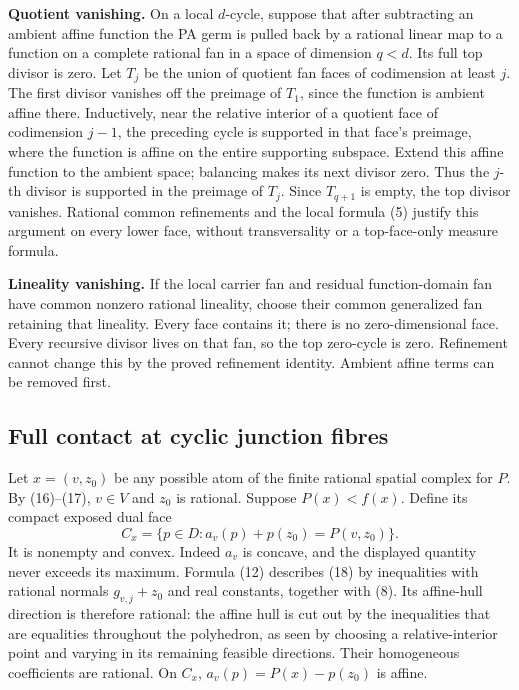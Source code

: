 \documentclass[
  11pt,
]{article}
\begin{document}
\textbf{Quotient vanishing.} On a local \(d\)-cycle, suppose that after
subtracting an ambient affine function the PA germ is pulled back by a
rational linear map to a function on a complete rational fan in a space
of dimension \(q<d\). Its full top divisor is zero. Let \(T_j\) be the
union of quotient fan faces of codimension at least \(j\). The first
divisor vanishes off the preimage of \(T_1\), since the function is
ambient affine there. Inductively, near the relative interior of a
quotient face of codimension \(j-1\), the preceding cycle is supported
in that face's preimage, where the function is affine on the entire
supporting subspace. Extend this affine function to the ambient space;
balancing makes its next divisor zero. Thus the \(j\)-th divisor is
supported in the preimage of \(T_j\). Since \(T_{q+1}\) is empty, the
top divisor vanishes. Rational common refinements and the local formula
(5) justify this argument on every lower face, without transversality or
a top-face-only measure formula.

\textbf{Lineality vanishing.} If the local carrier fan and residual
function-domain fan have common nonzero rational lineality, choose their
common generalized fan retaining that lineality. Every face contains it;
there is no zero-dimensional face. Every recursive divisor lives on that
fan, so the top zero-cycle is zero. Refinement cannot change this by the
proved refinement identity. Ambient affine terms can be removed first.

\subsection{Full contact at cyclic junction
fibres}\label{full-contact-at-cyclic-junction-fibres}

Let \(x=(v,z_0)\) be any possible atom of the finite rational spatial
complex for \(P\). By (16)--(17), \(v\in V\) and \(z_0\) is rational.
Suppose \(P(x)<f(x)\). Define its compact exposed dual face \[
 C_x=\{p\in D:a_v(p)+p(z_0)=P(v,z_0)\}.                                  \tag{18}
\] It is nonempty and convex. Indeed \(a_v\) is concave, and the
displayed quantity never exceeds its maximum. Formula (12) describes
(18) by inequalities with rational normals \(g_{v,j}+z_0\) and real
constants, together with (8). Its affine-hull direction is therefore
rational: the affine hull is cut out by the inequalities that are
equalities throughout the polyhedron, as seen by choosing a
relative-interior point and varying in its remaining feasible
directions. Their homogeneous coefficients are rational. On \(C_x\),
\(a_v(p)=P(x)-p(z_0)\) is affine.
\end{document}
